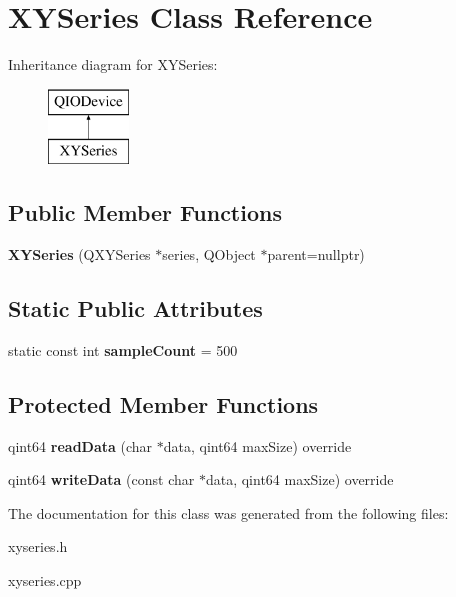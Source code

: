 \hypertarget{class_x_y_series}{}\section{X\+Y\+Series Class Reference}
\label{class_x_y_series}
Inheritance diagram for X\+Y\+Series\+:\begin{figure}[H]
\begin{center}
\leavevmode
\includegraphics[height=2.000000cm]{class_x_y_series}
\end{center}
\end{figure}
\subsection*{Public Member Functions}
\begin{DoxyCompactItemize}
\item 
\mbox{\label{class_x_y_series_ac5c6323142d7a0b6d373b6db65c4b8a2}} 
{\bfseries X\+Y\+Series} (Q\+X\+Y\+Series $\ast$series, Q\+Object $\ast$parent=nullptr)
\end{DoxyCompactItemize}
\subsection*{Static Public Attributes}
\begin{DoxyCompactItemize}
\item 
\mbox{\label{class_x_y_series_ad97f6e4696c65e77b67e51a3b14aea41}} 
static const int {\bfseries sample\+Count} = 500
\end{DoxyCompactItemize}
\subsection*{Protected Member Functions}
\begin{DoxyCompactItemize}
\item 
\mbox{\label{class_x_y_series_a55b3780fdc228b443a1993add02c4e7f}} 
qint64 {\bfseries read\+Data} (char $\ast$data, qint64 max\+Size) override
\item 
\mbox{\label{class_x_y_series_afa54e9a140aa7dff0c81d5d570bcb818}} 
qint64 {\bfseries write\+Data} (const char $\ast$data, qint64 max\+Size) override
\end{DoxyCompactItemize}


The documentation for this class was generated from the following files\+:\begin{DoxyCompactItemize}
\item 
xyseries.\+h\item 
xyseries.\+cpp\end{DoxyCompactItemize}
